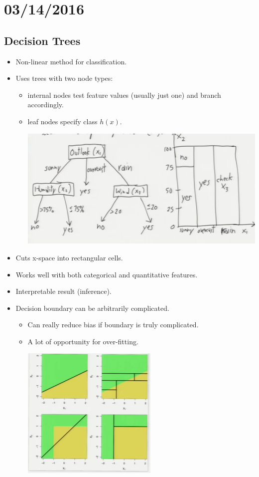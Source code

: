 \documentclass[10pt]{article}
\begin{document}
\section*{03/14/2016}
\subsection*{Decision Trees}
	\begin{itemize}
		\item Non-linear method for classification.
		\item Uses trees with two node types:
			\begin{itemize}
				\item internal nodes test feature values (usually just one) and branch accordingly.
				\item leaf nodes specify class $h(x)$.	
				\begin{center}
					\includegraphics[scale=0.6]{../images/tree:graph}
				\end{center}
			\end{itemize}
		\item Cuts x-space into rectangular cells.
		\item Works well with both categorical and quantitative features.
		\item Interpretable result (inference).
		\item Decision boundary can be arbitrarily complicated.
			\begin{itemize}
				\item Can really reduce bias if boundary is truly complicated.
				\item A lot of opportunity for over-fitting.
				\begin{center}
					\includegraphics[scale=0.8]{../images/decisiontreeexamples}

\end{center}
\end{itemize}
\end{itemize}
\end{document}
